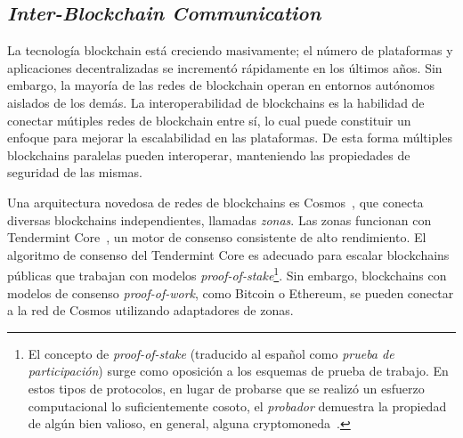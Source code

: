 
\subsection{\emph{Inter-Blockchain Communication}}
La tecnología blockchain está creciendo masivamente; el número de plataformas y
aplicaciones decentralizadas se incrementó rápidamente en los últimos años.
%
Sin embargo, la mayoría de las redes de blockchain operan en entornos autónomos aislados
de los demás.
%
La interoperabilidad de blockchains es la habilidad de conectar mútiples redes de
blockchain entre sí, lo cual puede constituir un enfoque para mejorar la escalabilidad en
las plataformas.
%
De esta forma múltiples blockchains paralelas pueden interoperar, manteniendo las
propiedades de seguridad de las mismas.

Una arquitectura novedosa de redes de blockchains es Cosmos~\cite{cosmos}, que conecta diversas
blockchains independientes, llamadas \emph{zonas}.
%
Las zonas funcionan con Tendermint Core~\cite{Buchman.2018.Tendermint}, un motor de consenso consistente de alto rendimiento.
%
El algoritmo de consenso del Tendermint Core es adecuado para escalar blockchains públicas que
trabajan con modelos \emph{proof-of-stake}\footnote{El concepto de \emph{proof-of-stake} (traducido al español
como \emph{prueba de participación}) surge como oposición a los esquemas de prueba de trabajo.
En estos tipos de protocolos, en lugar de probarse que se realizó un esfuerzo computacional lo suficientemente
cosoto, el \emph{probador} demuestra la propiedad de algún bien valioso, en general, alguna cryptomoneda~\cite{King2012PPCoinPC}.}.
%
Sin embargo, blockchains con modelos de consenso \emph{proof-of-work}, como Bitcoin o Ethereum,
se pueden conectar a la red de Cosmos utilizando adaptadores de zonas.

